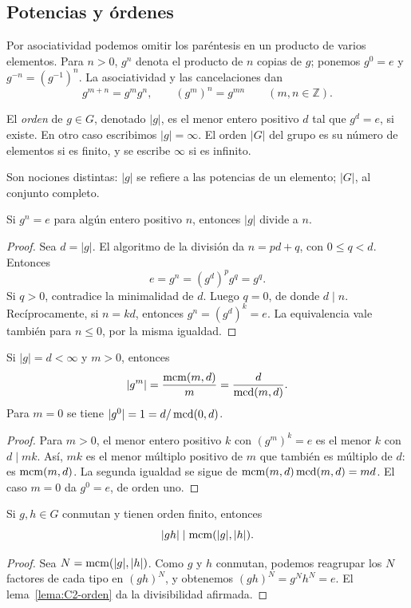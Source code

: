 \subsection{Potencias y órdenes}\label{tema:2-1-2}
Por asociatividad podemos omitir los paréntesis en un producto de varios elementos. Para $n>0$, $g^n$ denota el producto de $n$ copias de $g$; ponemos $g^0=e$ y $g^{-n}=(g^{-1})^n$. La asociatividad y las cancelaciones dan
\[
g^{m+n}=g^mg^n,\qquad (g^m)^n=g^{mn}\qquad(m,n\in\mathbb Z).
\]
\begin{defi}
El \emph{orden} de $g\in G$, denotado $|g|$, es el menor entero positivo $d$ tal que $g^d=e$, si existe. En otro caso escribimos $|g|=\infty$. El orden $|G|$ del grupo es su número de elementos si es finito, y se escribe $\infty$ si es infinito.
\end{defi}
Son nociones distintas: $|g|$ se refiere a las potencias de un elemento; $|G|$, al conjunto completo.

\begin{lema}\label{lema:C2-orden}
Si $g^n=e$ para algún entero positivo $n$, entonces $|g|$ divide a $n$.
\end{lema}
\begin{proof}
Sea $d=|g|$. El algoritmo de la división da $n=pd+q$, con $0\le q<d$. Entonces
\[
e=g^n=(g^d)^p g^q=g^q.
\]
Si $q>0$, contradice la minimalidad de $d$. Luego $q=0$, de donde $d\mid n$. Recíprocamente, si $n=kd$, entonces $g^n=(g^d)^k=e$. La equivalencia vale también para $n\le0$, por la misma igualdad.
\end{proof}

\begin{prop}\label{prop:C2-potencias}
Si $|g|=d<\infty$ y $m>0$, entonces
\[
|g^m|=\frac{\operatorname{mcm}(m,d)}m=\frac d{\operatorname{mcd}(m,d)}.
\]
Para $m=0$ se tiene $|g^0|=1=d/\operatorname{mcd}(0,d)$.
\end{prop}
\begin{proof}
Para $m>0$, el menor entero positivo $k$ con $(g^m)^k=e$ es el menor $k$ con $d\mid mk$. Así, $mk$ es el menor múltiplo positivo de $m$ que también es múltiplo de $d$: es $\operatorname{mcm}(m,d)$. La segunda igualdad se sigue de $\operatorname{mcm}(m,d)\operatorname{mcd}(m,d)=md$. El caso $m=0$ da $g^0=e$, de orden uno.
\end{proof}

\begin{prop}\label{prop:C2-producto-orden}
Si $g,h\in G$ conmutan y tienen orden finito, entonces
\[
|gh|\mid\operatorname{mcm}(|g|,|h|).
\]
\end{prop}
\begin{proof}
Sea $N=\operatorname{mcm}(|g|,|h|)$. Como $g$ y $h$ conmutan, podemos reagrupar los $N$ factores de cada tipo en $(gh)^N$, y obtenemos $(gh)^N=g^Nh^N=e$. El lema~\ref{lema:C2-orden} da la divisibilidad afirmada.
\end{proof}

